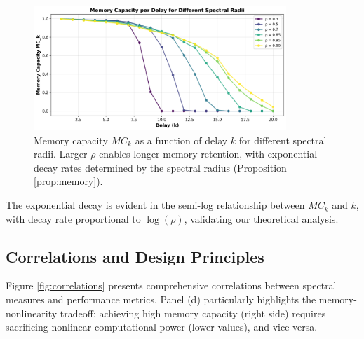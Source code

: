 \documentclass{article}
\begin{document}
\begin{figure}[htbp]
\centering
\includegraphics[width=0.85\textwidth]{fig4_memory_per_delay.png}
\caption{Memory capacity $MC_k$ as a function of delay $k$ for different spectral radii. Larger $\rho$ enables longer memory retention, with exponential decay rates determined by the spectral radius (Proposition \ref{prop:memory}).}
\label{fig:memory_delay}
\end{figure}

The exponential decay is evident in the semi-log relationship between $MC_k$ and $k$, with decay rate proportional to $\log(\rho)$, validating our theoretical analysis.

\subsection{Correlations and Design Principles}

Figure \ref{fig:correlations} presents comprehensive correlations between spectral measures and performance metrics. Panel (d) particularly highlights the memory-nonlinearity tradeoff: achieving high memory capacity (right side) requires sacrificing nonlinear computational power (lower values), and vice versa.
\end{document}
